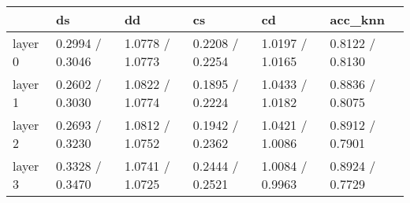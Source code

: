 \begin{tabular}{llllll}
\toprule
{} &               ds &               dd &               cs &               cd &          acc\_knn \\
\midrule
layer 0 &  0.2994 / 0.3046 &  1.0778 / 1.0773 &  0.2208 / 0.2254 &  1.0197 / 1.0165 &  0.8122 / 0.8130 \\
layer 1 &  0.2602 / 0.3030 &  1.0822 / 1.0774 &  0.1895 / 0.2224 &  1.0433 / 1.0182 &  0.8836 / 0.8075 \\
layer 2 &  0.2693 / 0.3230 &  1.0812 / 1.0752 &  0.1942 / 0.2362 &  1.0421 / 1.0086 &  0.8912 / 0.7901 \\
layer 3 &  0.3328 / 0.3470 &  1.0741 / 1.0725 &  0.2444 / 0.2521 &  1.0084 / 0.9963 &  0.8924 / 0.7729 \\
\bottomrule
\end{tabular}
